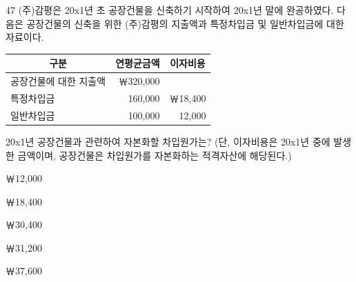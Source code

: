 \begin{question}{47}
(주)감평은 20x1년 초 공장건물을 신축하기 시작하여 20x1년 말에 완공하였다. 다음은 공장건물의 신축을 위한 (주)감평의 지출액과 특정차입금 및 일반차입금에 대한 자료이다.
\par{\small\centering
\begin{tabular}{|l|r|r|}
\hline
\multicolumn{1}{|c|}{구분} & \multicolumn{1}{c|}{연평균금액} & \multicolumn{1}{c|}{이자비용} \\ \hline
공장건물에 대한 지출액 & ￦320,000 & \\ \hline
특정차입금 & 160,000 & ￦18,400 \\ \hline
일반차입금 & 100,000 & 12,000 \\ \hline
\end{tabular}\par}
20x1년 공장건물과 관련하여 자본화할 차입원가는? (단, 이자비용은 20x1년 중에 발생한 금액이며, 공장건물은 차입원가를 자본화하는 적격자산에 해당된다.) \par
\begin{choices}
  \item ￦12,000
  \item ￦18,400
  \item ￦30,400
  \item ￦31,200
  \item ￦37,600
\end{choices}
\end{question}
